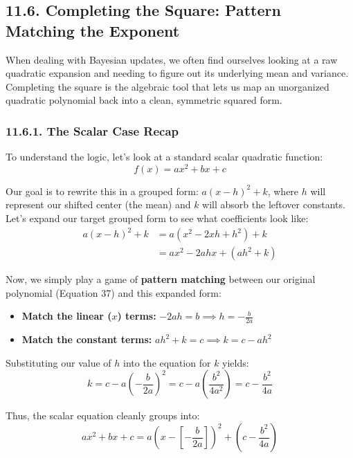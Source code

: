 \documentclass{article}
\begin{document}
\subsection*{11.6. Completing the Square: Pattern Matching the Exponent}

When dealing with Bayesian updates, we often find ourselves looking at a raw quadratic expansion and needing to figure out its underlying mean and variance. Completing the square is the algebraic tool that lets us map an unorganized quadratic polynomial back into a clean, symmetric squared form.

\subsubsection*{11.6.1. The Scalar Case Recap}
To understand the logic, let's look at a standard scalar quadratic function:
\begin{equation}
f(x) = ax^2 + bx + c \tag{37}
\end{equation}

Our goal is to rewrite this in a grouped form: $a(x - h)^2 + k$, where $h$ will represent our shifted center (the mean) and $k$ will absorb the leftover constants. Let's expand our target grouped form to see what coefficients look like:
\begin{align*}
a(x - h)^2 + k &= a(x^2 - 2xh + h^2) + k \\
&= ax^2 - 2ahx + (ah^2 + k)
\end{align*}

Now, we simply play a game of \textbf{pattern matching} between our original polynomial (Equation 37) and this expanded form:
\begin{itemize}
    \item \textbf{Match the linear ($x$) terms:} $-2ah = b \implies h = -\frac{b}{2a}$
    \item \textbf{Match the constant terms:} $ah^2 + k = c \implies k = c - ah^2$
\end{itemize}

Substituting our value of $h$ into the equation for $k$ yields:
\begin{equation*}
k = c - a\left(-\frac{b}{2a}\right)^2 = c - a\left(\frac{b^2}{4a^2}\right) = c - \frac{b^2}{4a}
\end{equation*}

Thus, the scalar equation cleanly groups into:
\begin{equation}
ax^2 + bx + c = a\left(x - \left[-\frac{b}{2a}\right]\right)^2 + \left(c - \frac{b^2}{4a}\right) \tag{38}
\end{equation}
\end{document}
